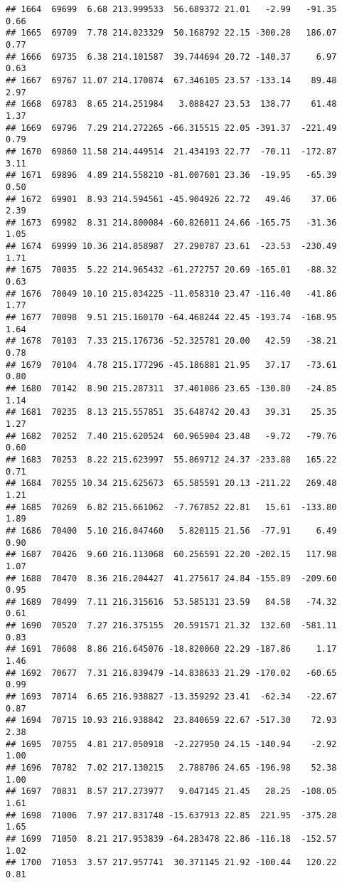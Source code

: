 \documentclass[]{article}
\begin{document}
\begin{verbatim}
## 1664  69699  6.68 213.999533  56.689372 21.01   -2.99   -91.35  0.66
## 1665  69709  7.78 214.023329  50.168792 22.15 -300.28   186.07  0.77
## 1666  69735  6.38 214.101587  39.744694 20.72 -140.37     6.97  0.63
## 1667  69767 11.07 214.170874  67.346105 23.57 -133.14    89.48  2.97
## 1668  69783  8.65 214.251984   3.088427 23.53  138.77    61.48  1.37
## 1669  69796  7.29 214.272265 -66.315515 22.05 -391.37  -221.49  0.79
## 1670  69860 11.58 214.449514  21.434193 22.77  -70.11  -172.87  3.11
## 1671  69896  4.89 214.558210 -81.007601 23.36  -19.95   -65.39  0.50
## 1672  69901  8.93 214.594561 -45.904926 22.72   49.46    37.06  2.39
## 1673  69982  8.31 214.800084 -60.826011 24.66 -165.75   -31.36  1.05
## 1674  69999 10.36 214.858987  27.290787 23.61  -23.53  -230.49  1.71
## 1675  70035  5.22 214.965432 -61.272757 20.69 -165.01   -88.32  0.63
## 1676  70049 10.10 215.034225 -11.058310 23.47 -116.40   -41.86  1.77
## 1677  70098  9.51 215.160170 -64.468244 22.45 -193.74  -168.95  1.64
## 1678  70103  7.33 215.176736 -52.325781 20.00   42.59   -38.21  0.78
## 1679  70104  4.78 215.177296 -45.186881 21.95   37.17   -73.61  0.80
## 1680  70142  8.90 215.287311  37.401086 23.65 -130.80   -24.85  1.14
## 1681  70235  8.13 215.557851  35.648742 20.43   39.31    25.35  1.27
## 1682  70252  7.40 215.620524  60.965904 23.48   -9.72   -79.76  0.60
## 1683  70253  8.22 215.623997  55.869712 24.37 -233.88   165.22  0.71
## 1684  70255 10.34 215.625673  65.585591 20.13 -211.22   269.48  1.21
## 1685  70269  6.82 215.661062  -7.767852 22.81   15.61  -133.80  1.89
## 1686  70400  5.10 216.047460   5.820115 21.56  -77.91     6.49  0.90
## 1687  70426  9.60 216.113068  60.256591 22.20 -202.15   117.98  1.07
## 1688  70470  8.36 216.204427  41.275617 24.84 -155.89  -209.60  0.95
## 1689  70499  7.11 216.315616  53.585131 23.59   84.58   -74.32  0.61
## 1690  70520  7.27 216.375155  20.591571 21.32  132.60  -581.11  0.83
## 1691  70608  8.86 216.645076 -18.820060 22.29 -187.86     1.17  1.46
## 1692  70677  7.31 216.839479 -14.838633 21.29 -170.02   -60.65  0.99
## 1693  70714  6.65 216.938827 -13.359292 23.41  -62.34   -22.67  0.87
## 1694  70715 10.93 216.938842  23.840659 22.67 -517.30    72.93  2.38
## 1695  70755  4.81 217.050918  -2.227950 24.15 -140.94    -2.92  1.00
## 1696  70782  7.02 217.130215   2.788706 24.65 -196.98    52.38  1.00
## 1697  70831  8.57 217.273977   9.047145 21.45   28.25  -108.05  1.61
## 1698  71006  7.97 217.831748 -15.637913 22.85  221.95  -375.28  1.65
## 1699  71050  8.21 217.953839 -64.283478 22.86 -116.18  -152.57  1.02
## 1700  71053  3.57 217.957741  30.371145 21.92 -100.44   120.22  0.81

\end{verbatim}
\end{document}
